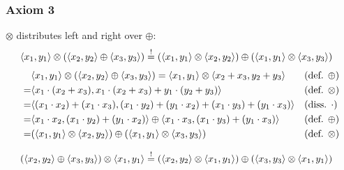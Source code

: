 \documentclass[a4paper,12pt]{ETHexercise}
\begin{document}
\subsubsection*{Axiom 3}
$\otimes$ distributes left and right over $\oplus$:
\begin{align}
        &\langle x_1, y_1\rangle \otimes (\langle x_2, y_2\rangle \oplus \langle x_3, y_3\rangle) \stackrel{!}{=} (\langle x_1, y_1\rangle \otimes \langle x_2, y_2\rangle) \oplus (\langle x_1, y_1\rangle \otimes\langle x_3, y_3\rangle)
\end{align}
\begin{align}
    &\langle x_1, y_1\rangle \otimes (\langle x_2, y_2\rangle \oplus \langle x_3, y_3\rangle) = \langle x_1, y_1\rangle \otimes \langle x_2 + x_3, y_2 + y_3\rangle &&(\text{def. }\oplus)\\
    = &\langle x_1 \cdot (x_2 + x_3), x_1 \cdot (x_2 + x_3) + y_1 \cdot (y_2 + y_3)\rangle &&(\text{def. }\otimes)\\
    = &\langle(x_1 \cdot x_2) + (x_1 \cdot x_3),  (x_1 \cdot y_2) + (y_1 \cdot x_2) + (x_1 \cdot y_3)  + (y_1 \cdot x_3)\rangle &&(\text{diss. }\cdot)\\
    = &\langle x_1 \cdot x_2, (x_1 \cdot y_2) + (y_1 \cdot x_2)\rangle \oplus \langle x_1 \cdot x_3, (x_1 \cdot y_3)  + (y_1 \cdot x_3)\rangle &&(\text{def. }\oplus)\\
    =   &(\langle x_1, y_1\rangle \otimes \langle x_2, y_2\rangle) \oplus (\langle x_1, y_1\rangle \otimes \langle x_3, y_3\rangle) &&(\text{def. }\otimes)
\end{align}

\begin{align}
        &(\langle x_2, y_2\rangle \oplus \langle x_3, y_3\rangle) \otimes \langle x_1, y_1\rangle \stackrel{!}{=} (\langle x_2, y_2\rangle \otimes \langle x_1, y_1\rangle) \oplus (\langle x_3, y_3\rangle \otimes \langle x_1, y_1\rangle)
\end{align}
\end{document}
